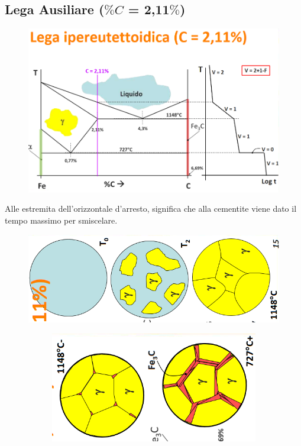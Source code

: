 \documentclass{article}
\begin{document}
{        \subsection{Lega Ausiliare ($\%C$ = 2,11$\%$)}
            \begin{figure}[h!]
                \centering
                \includegraphics[width=.8\linewidth]{L13 - Fe-C 2,11C Diagramma di stato e linea di raffreddamento.png}
            \end{figure}
            Alle estremita dell'orizzontale d'arresto, significa che alla cementite viene dato il tempo massimo per smiscelare.\\
            \begin{figure}[h!]
                \centering
                \includegraphics[width=.85\linewidth]{L13 - Cambio di struttura per C = 2,11 prima del eutettico.png}
            \end{figure}
            \begin{figure}
                \centering
                \begin{subfigure}[h!]{.6\linewidth}
                    \includegraphics[width=\linewidth]{L13 - Cambio di struttura per C = 2,11 dopo l'eutettico e prima del eutettoidico.png}

\end{subfigure}
\end{figure}}
\end{document}
